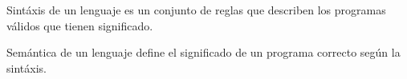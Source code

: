 \documentclass[a4paper,twoside,master.tex]{article}
\begin{document}

\begin{definicion}
    Sintáxis de un lenguaje es un conjunto de reglas que describen los programas válidos que tienen significado.
\end{definicion}

\begin{definicion}
    Semántica de un lenguaje define el significado de un programa correcto según la sintáxis.
\end{definicion}
\end{document}
